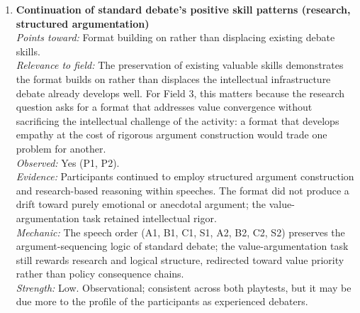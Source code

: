 \documentclass[12pt]{article}
\begin{document}
\begin{enumerate}
\textit{Mechanic:} The character assignment system (``you represent the Subject's value of X'') and the personal dilemma motion structure (providing a named character with specific circumstances) invite perspective-taking without instructing it; the Subject as a named individual rather than an abstract adjudicator provides a concrete human recipient for empathetic reasoning. The absence of a rebuttal-rewarding scoring category inverts the rhetorical incentive structure, making polite, collaborative, synthesis-oriented engagement strategically advantageous rather than weakly punished.\\
\textit{Strength:} Strong. Behavioral for second playtest; self-report for first playtest; consistent direction.

\item \textbf{Continuation of standard debate's positive skill patterns (research, structured argumentation)}\\
\textit{Points toward:} Format building on rather than displacing existing debate skills.\\
\textit{Relevance to field:} The preservation of existing valuable skills demonstrates the format builds on rather than displaces the intellectual infrastructure debate already develops well. For Field 3, this matters because the research question asks for a format that addresses value convergence without sacrificing the intellectual challenge of the activity: a format that develops empathy at the cost of rigorous argument construction would trade one problem for another.\\
\textit{Observed:} Yes (P1, P2).\\
\textit{Evidence:} Participants continued to employ structured argument construction and research-based reasoning within speeches. The format did not produce a drift toward purely emotional or anecdotal argument; the value-argumentation task retained intellectual rigor.\\
\textit{Mechanic:} The speech order (A1, B1, C1, S1, A2, B2, C2, S2) preserves the argument-sequencing logic of standard debate; the value-argumentation task still rewards research and logical structure, redirected toward value priority rather than policy consequence chains.\\
\textit{Strength:} Low. Observational; consistent across both playtests, but it may be due more to the profile of the participants as experienced debaters. 


\end{enumerate}
\end{document}
